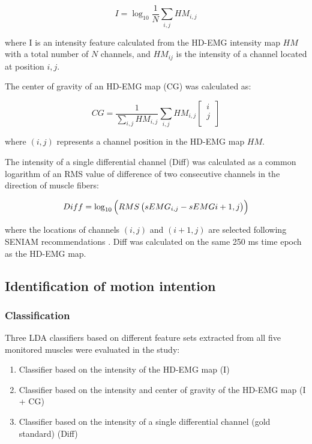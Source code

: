 \begin{equation} \label{eq:1-2}
I = \log_{10} \frac{1}{N} \displaystyle\sum_{i,j} HM_{i,j}
\end{equation}

where I is an intensity feature calculated from the HD-EMG intensity map $HM$ with a total number of $N$ channels, and $HM_{ij}$ is the intensity of a channel located at position $i,j$.

The center of gravity of an HD-EMG map (CG) was calculated as:

\begin{equation} \label{eq:1-3}
CG = \frac{1}{\sum_{i,j} HM_{i,j}}
\displaystyle\sum_{i,j} HM_{i,j} 
	\begin{bmatrix}
	  \, i \,\\
	  \, j \,\\
	  \end{bmatrix}
\end{equation}

where $(i,j)$ represents a channel position in the HD-EMG map $HM$.

The intensity of a single differential channel (Diff) was calculated as a common logarithm of an RMS value of difference of two consecutive channels in the direction of muscle fibers: 

\begin{equation} \label{eq:1-4}
Diff = \log_{10} \, \Bigl(RMS \,\bigl(sEMG_{i,j} - sEMG{i+1,j}\bigr)\Bigr)
\end{equation}

where the locations of channels $(i,j)$ and $(i + 1,j)$ are selected following SENIAM recommendations \citep{Hermens1999}. Diff was calculated on the same 250 ms time epoch as the HD-EMG map.


\subsection{Identification of motion intention}
\subsubsection{Classification}
Three LDA classifiers based on different feature sets extracted from all five monitored muscles were evaluated in the study:
\begin{enumerate}
\item Classifier based on the intensity of the HD-EMG map (I)
\item Classifier based on the intensity and center of gravity of the HD-EMG map (I + CG)
\item Classifier based on the intensity of a single differential channel (gold standard) (Diff)
\end {enumerate}


